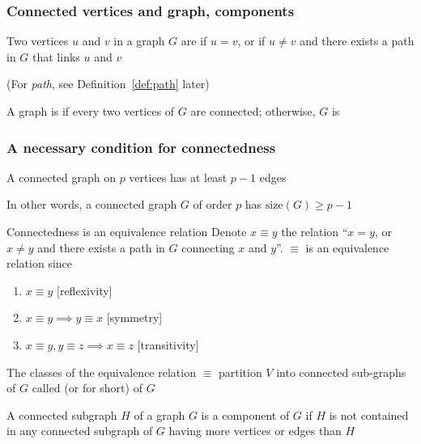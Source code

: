 \documentclass[aspectratio=169]{beamer}\usepackage[]{graphicx}\usepackage[]{xcolor}
\begin{document}
\begin{frame}\frametitle{Connected vertices and graph, components}
\begin{definition}
Two vertices $u$ and $v$ in a graph $G$ are  if $u=v$, or if $u\not =v$ and there exists a path in $G$ that links $u$ and $v$
\end{definition}
(For \emph{path}, see Definition~\ref{def:path} later)
\vfill
\begin{definition}
A graph is  if every two vertices of $G$ are connected; otherwise, $G$ is 
\end{definition}
\end{frame}

\begin{frame}\frametitle{A necessary condition for connectedness}
	\begin{theorem}
		A connected graph on $p$ vertices has at least $p-1$ edges
	\end{theorem}
	\vfill
	In other words, a connected graph $G$ of order $p$ has $\text{size}(G)\geq p-1$
\end{frame}

\begin{frame}{Connectedness is an equivalence relation}
	Denote $x\equiv y$ the relation  ``$x=y$, or $x\neq y$ and there exists a path in $G$ connecting $x$ and $y$''. $\equiv$ is an equivalence relation since
	\begin{enumerate}
		\item $x\equiv y$ \hfill[reflexivity]
		\item $x\equiv y\implies y\equiv x$ \hfill[symmetry]
		\item $x\equiv y, y\equiv z\implies x\equiv z$ \hfill[transitivity]
	\end{enumerate}
	\vfill
	\begin{definition}
		The classes of the equivalence relation $\equiv$ partition $V$ into connected sub-graphs of $G$ called  (or  for short) of $G$
	\end{definition}
	\vfill
	A connected subgraph $H$ of a graph $G$ is a component of $G$ if $H$ is not contained in any connected subgraph of $G$ having more vertices or edges than $H$
\end{frame}
\end{document}
